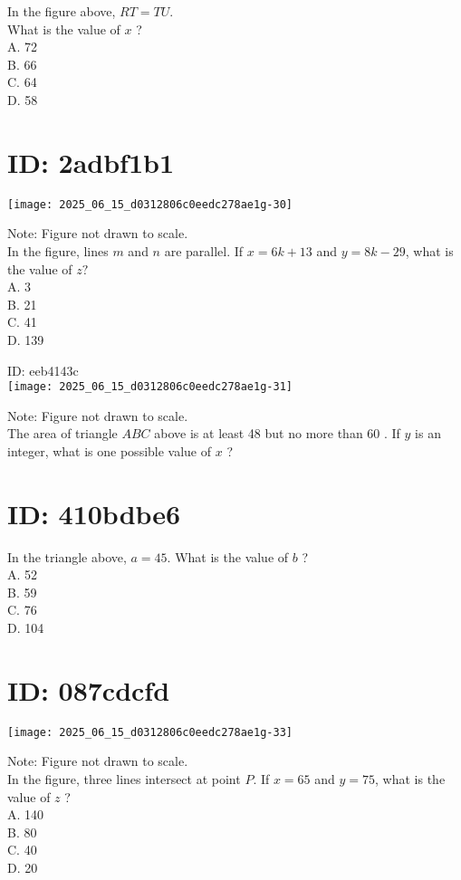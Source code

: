 In the figure above, $R T=T U$.\\
What is the value of $x$ ?\\
A. 72\\
B. 66\\
C. 64\\
D. 58

\section*{ID: 2adbf1b1}
\begin{center}
\texttt{[image: 2025\_06\_15\_d0312806c0eedc278ae1g-30]}
\end{center}

Note: Figure not drawn to scale.\\
In the figure, lines $m$ and $n$ are parallel. If $x=6 k+13$ and $y=8 k-29$, what is the value of $z ?$\\
A. 3\\
B. 21\\
C. 41\\
D. 139

ID: eeb4143c\\
\texttt{[image: 2025\_06\_15\_d0312806c0eedc278ae1g-31]}

Note: Figure not drawn to scale.\\
The area of triangle $A B C$ above is at least 48 but no more than 60 . If $y$ is an integer, what is one possible value of $x$ ?

\section*{ID: 410bdbe6}
In the triangle above, $a=45$. What is the value of $b$ ?\\
A. 52\\
B. 59\\
C. 76\\
D. 104

\section*{ID: 087cdcfd}
\begin{center}
\texttt{[image: 2025\_06\_15\_d0312806c0eedc278ae1g-33]}
\end{center}

Note: Figure not drawn to scale.\\
In the figure, three lines intersect at point $P$. If $x=65$ and $y=75$, what is the value of $z$ ?\\
A. 140\\
B. 80\\
C. 40\\
D. 20

